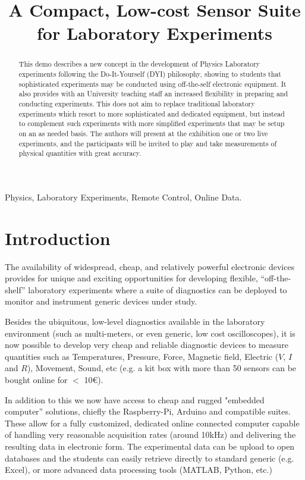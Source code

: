 \documentclass[conference]{IEEEtran}
\begin{document}
\title{A Compact, Low-cost Sensor Suite  for Laboratory Experiments
}

\author{}
\maketitle

\begin{abstract}
This demo describes a new concept in the development of Physics Laboratory experiments 
 following  the Do-It-Yourself (DYI) philosophy, showing to students that sophisticated experiments may be conducted using off-the-self electronic equipment.
It also provides with an University teaching staff an increased flexibility in preparing and conducting experiments. 
This does not aim to replace traditional laboratory experiments which resort to more sophisticated and dedicated equipment,
but instead to complement such experiments with more simplified experiments that may be setup on an as needed basis.
The authors will present at the exhibition one or two live experiments, and the participants will be invited to play 
and take measurements of physical quantities with great accuracy.

\end{abstract}

\begin{IEEEkeywords}
Physics, Laboratory Experiments, Remote Control, Online Data.
\end{IEEEkeywords}

\section{Introduction}
The availability of widespread, cheap, and relatively powerful electronic devices provides for unique and exciting opportunities for developing flexible, ``off-the-shelf'' laboratory experiments where a suite of diagnostics can be deployed to monitor and instrument generic devices under study.

Besides the ubiquitous, low-level diagnostics available in the laboratory environment (such as multi-meters, or even generic, low cost oscilloscopes), it is now possible to develop very cheap and reliable diagnostic devices to measure quantities such as  
Temperatures, Pressure, Force, Magnetic field, Electric ($V$, $I$ and $R$), Movement, Sound, etc (e.g. a kit box with more than 50 sensors can be bought online for $<$ 10€).

In addition to this we now have access to cheap and rugged "embedded computer” solutions, chiefly the Raspberry-Pi, Arduino\cite{b2} and compatible suites.
These allow for a fully customized, dedicated online connected computer capable of handling very reasonable acquisition rates (around 10kHz) 
and delivering the resulting data in electronic form. 
The experimental data can be upload to open databases and the students can easily retrieve 
 directly to standard generic (e.g. Excel), or more advanced data processing tools
 (MATLAB, Python, etc.)
\end{document}
